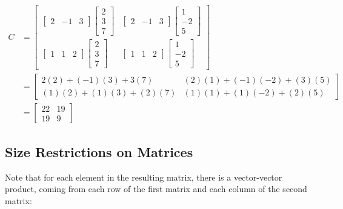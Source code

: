 \begin{example}
\begin{align*}
C & =
\begin{bmatrix}
\begin{bmatrix}
 2  & -1 & 3 	
\end{bmatrix}
\begin{bmatrix}
2 \\ 3 \\ 7
\end{bmatrix}
& 
\begin{bmatrix}
2 & -1 & 3 
\end{bmatrix}
\begin{bmatrix}
1 \\ -2 \\ 5
\end{bmatrix} \\
\begin{bmatrix}
1 & 1 & 2
\end{bmatrix}
\begin{bmatrix}
2 \\ 3 \\ 7
\end{bmatrix}
& 
\begin{bmatrix}
1 & 1 & 2
\end{bmatrix}
\begin{bmatrix}
1 \\ -2 \\ 5
\end{bmatrix}
\end{bmatrix}
 \\
& = 
\begin{bmatrix}
2(2) + (-1)(3) + 3(7) & (2)(1) + (-1)(-2) + (3)(5) \\
(1)(2) + (1)(3) +(2)(7) & (1)(1) + (1)(-2) + (2)(5) 
\end{bmatrix} \\
& = \begin{bmatrix}
22 & 19 \\ 19 & 9 
\end{bmatrix}
\end{align*}

\end{example}

\subsection{Size Restrictions on Matrices}

Note that for each element in the resulting matrix, there is a vector-vector product, coming from each row of the first matrix and each column of the second matrix: 

